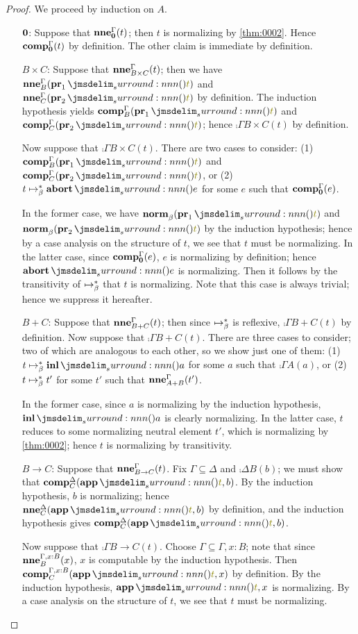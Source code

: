 \documentclass[a4paper]{article}
\begin{document}
\begin{proof}
  We proceed by induction on $A$.
  \begin{itemize}
  \item[$\mathbf{0}$:] Suppose that $\operatorname{\mathbf{nne}}^{\Gamma}_{\mathbf{0}}(t)$; then $t$ is normalizing by \cref{thm:0002}.
    Hence $\operatorname{\mathbf{comp}}^{\Gamma}_{\mathbf{0}}(t)$ by definition.
    The other claim is immediate by definition.
  \item[$B \times C$:] Suppose that $\operatorname{\mathbf{nne}}^{\Gamma}_{B \times C}(t)$; then we have $\neu{\Gamma}{B}(\tmPrl{t})$ and $\neu{\Gamma}{C}(\tmPrr{t})$ by definition.
    The induction hypothesis yields $\comp{\Gamma}{B}(\tmPrl{t})$ and $\comp{\Gamma}{C}(\tmPrr{t})$; hence $\comp{\Gamma}{B \times C}(t)$ by definition.
    
    Now suppose that $\comp{\Gamma}{B \times C}(t)$.
    There are two cases to consider: (1) $\comp{\Gamma}{B}(\tmPrl{t})$ and $\comp{\Gamma}{C}(\tmPrr{t})$, or (2) $t \bRed* \tmAbort{e}$ for some $e$ such that $\operatorname{\mathbf{comp}}^{\Gamma}_{\mathbf{0}}(e)$.
    
    In the former case, we have $\norm(\tmPrl{t})$ and $\norm(\tmPrr{t})$ by the induction hypothesis; hence by a case analysis on the structure of $t$, we see that $t$ must be normalizing.
    In the latter case, since $\operatorname{\mathbf{comp}}^{\Gamma}_{\mathbf{0}}(e)$, $e$ is normalizing by definition; hence $\tmAbort{e}$ is normalizing.
    Then it follows by the transitivity of $\bRed*$ that $t$ is normalizing.
    Note that this case is always trivial; hence we suppress it hereafter.
  \item[$B + C$:] Suppose that $\operatorname{\mathbf{nne}}^{\Gamma}_{B + C}(t)$; then since $\bRed*$ is reflexive, $\comp{\Gamma}{B + C}(t)$ by definition.
    Now suppose that $\comp{\Gamma}{B + C}(t)$.
    There are three cases to consider; two of which are analogous to each other, so we show just one of them: (1) $t \bRed* \tmInl{a}$ for some $a$ such that $\comp{\Gamma}{A}(a)$, or (2) $t \bRed* t'$ for some $t'$ such that $\operatorname{\mathbf{nne}}^{\Gamma}_{A + B}(t')$.

    In the former case, since $a$ is normalizing by the induction hypothesis, $\tmInl{a}$ is clearly normalizing.
    In the latter case, $t$ reduces to some normalizing neutral element $t'$, which is normalizing by \cref{thm:0002}; hence $t$ is normalizing by transitivity.
  \item[$B \to C$:] Suppose that $\operatorname{\mathbf{nne}}^{\Gamma}_{B \to C}(t)$.
    Fix $\Gamma \subseteq \Delta$ and $\comp{\Delta}{B}(b)$; we must show that $\comp{\Delta}{C}(\tmApp{t}{b})$.
    By the induction hypothesis, $b$ is normalizing; hence $\neu{\Delta}{C}(\tmApp{t}{b})$ by definition, and the induction hypothesis gives $\comp{\Delta}{C}(\tmApp{t}{b})$.

    Now suppose that $\comp{\Gamma}{B \to C}(t)$.
    Choose $\Gamma \subseteq \Gamma,x : B$; note that since $\operatorname{\mathbf{nne}}^{\Gamma,x : B}_{B}(x)$, $x$ is computable by the induction hypothesis.
    Then $\comp{\Gamma,x : B}{C}(\tmApp{t}{x})$ by definition.
    By the induction hypothesis, $\tmApp{t}{x}$ is normalizing.
    By a case analysis on the structure of $t$, we see that $t$ must be normalizing.
  \end{itemize}
\end{proof}
\end{document}

